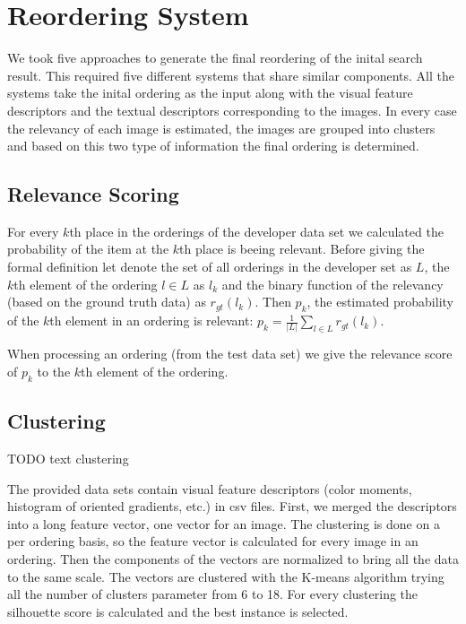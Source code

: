\documentclass{acm_proc_article-me}
\begin{document}
\section{Reordering System}

We took five approaches to generate the final reordering of the inital search result. This required five different systems that share similar components. All the systems take the inital ordering as the input along with the visual feature descriptors and the textual descriptors corresponding to the images. In every case the relevancy of each image is estimated, the images are grouped into clusters and based on this two type of information the final ordering is determined.

\subsection{Relevance Scoring}

For every $k$th place in the orderings of the developer data set we calculated the probability of the item at the $k$th place is beeing relevant. Before giving the formal definition let denote the set of all orderings in the developer set as $L$, the $k$th element of the ordering $l \in L$ as $l_k$ and the binary function of the relevancy (based on the ground truth data) as $r_{gt}(l_k)$. Then $p_k$, the estimated probability of the $k$th element in an ordering is relevant:
$p_k = \frac{1}{|L|}\sum_{l \in L}r_{gt}(l_k)$.

When processing an ordering (from the test data set) we give the relevance score of $p_k$ to the $k$th element of the ordering.

\subsection{Clustering}

TODO text clustering

The provided data sets contain visual feature descriptors (color moments, histogram of oriented gradients, etc.) in csv files. First, we merged the descriptors into a long feature vector, one vector for an image. The clustering is done on a per ordering basis, so the feature vector is calculated for every image in an ordering. Then the components of the vectors are normalized to bring all the data to the same scale. The vectors are clustered with the K-means algorithm trying all the number of clusters parameter from 6 to 18. For every clustering the silhouette score \cite{rousseeuw1987silhouettes} is calculated and the best instance is selected.
\end{document}
